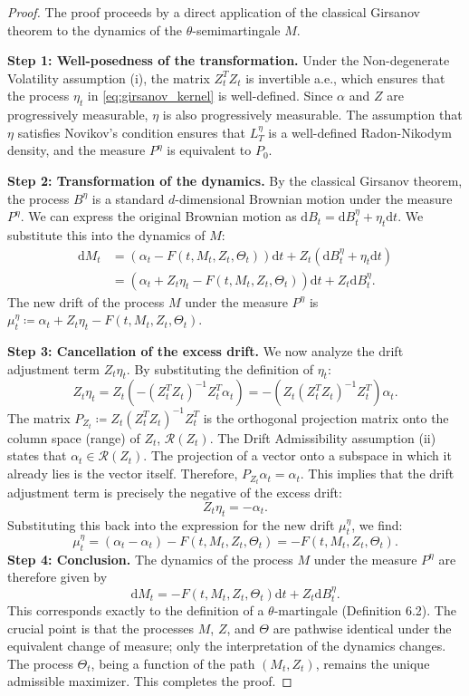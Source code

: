 \documentclass[12pt, letterpaper]{amsart}
\newcommand{\dd}{\mathrm{d}}
\theoremstyle{plain}
\theoremstyle{definition}
\theoremstyle{remark}
\numberwithin{equation}{section} %
\begin{document}
\begin{proof}
The proof proceeds by a direct application of the classical Girsanov theorem to the dynamics of the \(\theta\)-semimartingale \(M\).

\noindent\textbf{Step 1: Well-posedness of the transformation.}
Under the Non-degenerate Volatility assumption (i), the matrix \(Z_t^T Z_t\) is invertible a.e., which ensures that the process \(\eta_t\) in \eqref{eq:girsanov_kernel} is well-defined. Since \(\alpha\) and \(Z\) are progressively measurable, \(\eta\) is also progressively measurable. The assumption that \(\eta\) satisfies Novikov's condition ensures that \(L_T^\eta\) is a well-defined Radon-Nikodym density, and the measure \(P^\eta\) is equivalent to \(P_0\).

\noindent\textbf{Step 2: Transformation of the dynamics.}
By the classical Girsanov theorem, the process \(B^\eta\) is a standard \(d\)-dimensional Brownian motion under the measure \(P^\eta\). We can express the original Brownian motion as \(\dd B_t = \dd B_t^\eta + \eta_t \dd t\). We substitute this into the dynamics of \(M\):
\begin{align*}
    \dd M_t &= \left(\alpha_t - F(t, M_t, Z_t, \Theta_t)\right) \dd t + Z_t (\dd B_t^\eta + \eta_t \dd t) \\
    &= \left( \alpha_t + Z_t \eta_t - F(t, M_t, Z_t, \Theta_t) \right) \dd t + Z_t \dd B_t^\eta.
\end{align*}
The new drift of the process \(M\) under the measure \(P^\eta\) is \(\mu_t^\eta \coloneqq \alpha_t + Z_t \eta_t - F(t, M_t, Z_t, \Theta_t)\).

\noindent\textbf{Step 3: Cancellation of the excess drift.}
We now analyze the drift adjustment term \(Z_t \eta_t\). By substituting the definition of \(\eta_t\):
\[
    Z_t \eta_t = Z_t \left( -(Z_t^T Z_t)^{-1} Z_t^T \alpha_t \right) = - \left( Z_t (Z_t^T Z_t)^{-1} Z_t^T \right) \alpha_t.
\]
The matrix \(P_{Z_t} \coloneqq Z_t (Z_t^T Z_t)^{-1} Z_t^T\) is the orthogonal projection matrix onto the column space (range) of \(Z_t\), \(\mathcal{R}(Z_t)\). The Drift Admissibility assumption (ii) states that \(\alpha_t \in \mathcal{R}(Z_t)\). The projection of a vector onto a subspace in which it already lies is the vector itself. Therefore, \(P_{Z_t} \alpha_t = \alpha_t\).
This implies that the drift adjustment term is precisely the negative of the excess drift:
\[
    Z_t \eta_t = -\alpha_t.
\]
Substituting this back into the expression for the new drift \(\mu_t^\eta\), we find:
\[
    \mu_t^\eta = (\alpha_t - \alpha_t) - F(t, M_t, Z_t, \Theta_t) = -F(t, M_t, Z_t, \Theta_t).
\]
\noindent\textbf{Step 4: Conclusion.}
The dynamics of the process \(M\) under the measure \(P^\eta\) are therefore given by
\[
    \dd M_t = -F(t, M_t, Z_t, \Theta_t) \dd t + Z_t \dd B_t^\eta.
\]
This corresponds exactly to the definition of a \(\theta\)-martingale (Definition 6.2). The crucial point is that the processes \(M\), \(Z\), and \(\Theta\) are pathwise identical under the equivalent change of measure; only the interpretation of the dynamics changes. The process \(\Theta_t\), being a function of the path \((M_t, Z_t)\), remains the unique admissible maximizer. This completes the proof.
\end{proof}
\end{document}
